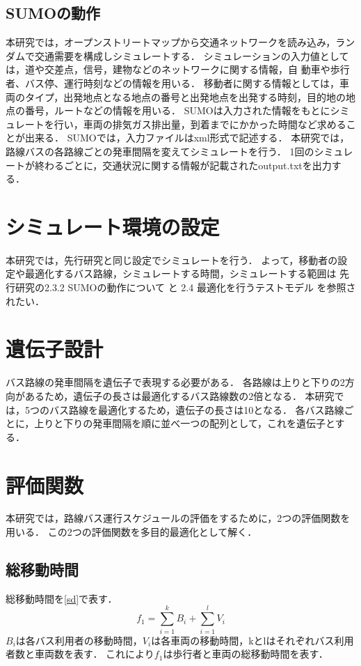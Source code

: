 \documentclass[main]{subfiles}
\begin{document}
        \subsection{SUMOの動作}
        本研究では，オープンストリートマップから交通ネットワークを読み込み，ランダムで交通需要を構成しシミュレートする．
        シミュレーションの入力値としては，道や交差点，信号，建物などのネットワークに関する情報，自
        動車や歩行者、バス停、運行時刻などの情報を用いる．
        移動者に関する情報としては，車両のタイプ，出発地点となる地点の番号と出発地点を出発する時刻，目的地の地点の番号，ルートなどの情報を用いる．
        SUMOは入力された情報をもとにシミュレートを行い，車両の排気ガス排出量，到着までにかかった時間など求めることが出来る．
        SUMOでは，入力ファイルはxml形式で記述する．
        本研究では，路線バスの各路線ごとの発車間隔を変えてシミュレートを行う．
        1回のシミュレートが終わるごとに，交通状況に関する情報が記載されたoutput.txtを出力する．
    
    \section{シミュレート環境の設定}
    本研究では，先行研究\cite{senkoukenkyu}と同じ設定でシミュレートを行う．
    よって，移動者の設定や最適化するバス路線，シミュレートする時間，シミュレートする範囲は
    先行研究\cite{senkoukenkyu}の2.3.2 SUMOの動作について と 2.4 最適化を行うテストモデル を参照されたい．
    
    \section{遺伝子設計}
    バス路線の発車間隔を遺伝子で表現する必要がある．
    各路線は上りと下りの2方向があるため，遺伝子の長さは最適化するバス路線数の2倍となる．
    本研究では，5つのバス路線を最適化するため，遺伝子の長さは10となる．
    各バス路線ごとに，上りと下りの発車間隔を順に並べ一つの配列として，これを遺伝子とする．
    
    \section{評価関数}
    本研究では，路線バス運行スケジュールの評価をするために，2つの評価関数を用いる．
    この2つの評価関数を多目的最適化として解く．
    
        \subsection{総移動時間}
        総移動時間を\ref{sd}で表す．
        \begin{equation}
            f_1 = \sum_{i=1}^{k} B_i + \sum_{i=1}^{l} V_i
            \label{sd}
        \end{equation}
        $B_i$は各バス利用者の移動時間，$V_i$は各車両の移動時間，kとlはそれぞれバス利用者数と車両数を表す．
        これにより$f_1$は歩行者と車両の総移動時間を表す．
\end{document}
